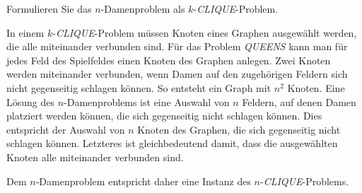 Formulieren Sie das $n$-Damenproblem als $k$-\textit{CLIQUE}-Problem.

\begin{loesung}
In einem $k$-\textit{CLIQUE}-Problem müssen Knoten eines Graphen
ausgewählt werden, die alle miteinander verbunden sind.
Für das Problem \textit{QUEENS} kann man für jedes Feld des Spielfeldes
einen Knoten des Graphen anlegen.
Zwei Knoten werden miteinander verbunden, wenn Damen auf den zugehörigen
Feldern sich nicht gegenseitig schlagen können.
So entsteht ein Graph mit $n^2$ Knoten.
Eine Lösung des $n$-Damenproblems ist eine Auswahl von $n$ Feldern,
auf denen Damen platziert werden können, die sich gegenseitig
nicht schlagen können.
Dies entspricht der Auswahl von $n$ Knoten des Graphen, die sich
gegenseitig nicht schlagen können.
Letzteres ist gleichbedeutend damit, dass die ausgewählten Knoten
alle miteinander verbunden sind.

Dem $n$-Damenproblem entspricht daher eine Instanz des
$n$-\textit{CLIQUE}-Problems.
\end{loesung}
